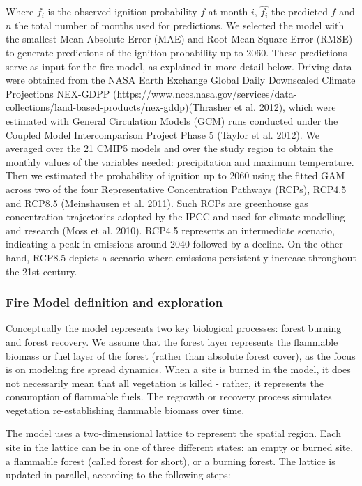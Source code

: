 \documentclass[
]{article}
\begin{document}
Where \(f_i\) is the observed ignition probability \(f\) at month \(i\),
\(\hat{f_i}\) the predicted \(f\) and \(n\) the total number of months
used for predictions. We selected the model with the smallest Mean
Absolute Error (MAE) and Root Mean Square Error (RMSE) to generate
predictions of the ignition probability up to 2060. These predictions
serve as input for the fire model, as explained in more detail below.
Driving data were obtained from the NASA Earth Exchange Global Daily
Downscaled Climate Projections NEX-GDPP
(https://www.nccs.nasa.gov/services/data-collections/land-based-products/nex-gddp)(Thrasher
et al. 2012), which were estimated with General Circulation Models (GCM)
runs conducted under the Coupled Model Intercomparison Project Phase 5
(Taylor et al. 2012). We averaged over the 21 CMIP5 models and over the
study region to obtain the monthly values of the variables needed:
precipitation and maximum temperature. Then we estimated the probability
of ignition up to 2060 using the fitted GAM across two of the four
Representative Concentration Pathways (RCPs), RCP4.5 and RCP8.5
(Meinshausen et al. 2011). Such RCPs are greenhouse gas concentration
trajectories adopted by the IPCC and used for climate modelling and
research (Moss et al. 2010). RCP4.5 represents an intermediate scenario,
indicating a peak in emissions around 2040 followed by a decline. On the
other hand, RCP8.5 depicts a scenario where emissions persistently
increase throughout the 21st century.

\subsubsection{Fire Model definition and
exploration}\label{fire-model-definition-and-exploration}

Conceptually the model represents two key biological processes: forest
burning and forest recovery. We assume that the forest layer represents
the flammable biomass or fuel layer of the forest (rather than absolute
forest cover), as the focus is on modeling fire spread dynamics. When a
site is burned in the model, it does not necessarily mean that all
vegetation is killed - rather, it represents the consumption of
flammable fuels. The regrowth or recovery process simulates vegetation
re-establishing flammable biomass over time.

The model uses a two-dimensional lattice to represent the spatial
region. Each site in the lattice can be in one of three different
states: an empty or burned site, a flammable forest (called forest for
short), or a burning forest. The lattice is updated in parallel,
according to the following steps:
\end{document}
